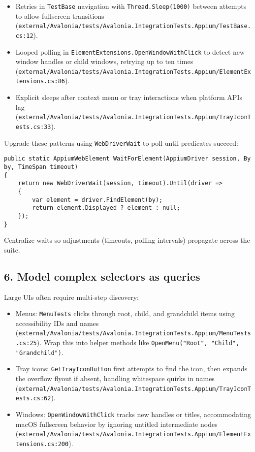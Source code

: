 \begin{itemize}
\tightlist
\item
  Retries in \passthrough{\lstinline!TestBase!} navigation with
  \passthrough{\lstinline!Thread.Sleep(1000)!} between attempts to allow
  fullscreen transitions
  (\passthrough{\lstinline!external/Avalonia/tests/Avalonia.IntegrationTests.Appium/TestBase.cs:12!}).
\item
  Looped polling in
  \passthrough{\lstinline!ElementExtensions.OpenWindowWithClick!} to
  detect new window handles or child windows, retrying up to ten times
  (\passthrough{\lstinline!external/Avalonia/tests/Avalonia.IntegrationTests.Appium/ElementExtensions.cs:86!}).
\item
  Explicit sleeps after context menu or tray interactions when platform
  APIs lag
  (\passthrough{\lstinline!external/Avalonia/tests/Avalonia.IntegrationTests.Appium/TrayIconTests.cs:33!}).
\end{itemize}

Upgrade these patterns using \passthrough{\lstinline!WebDriverWait!} to
poll until predicates succeed:

\begin{lstlisting}
public static AppiumWebElement WaitForElement(AppiumDriver session, By by, TimeSpan timeout)
{
    return new WebDriverWait(session, timeout).Until(driver =>
    {
        var element = driver.FindElement(by);
        return element.Displayed ? element : null;
    });
}
\end{lstlisting}

Centralize waits so adjustments (timeouts, polling intervals) propagate
across the suite.

\subsection{6. Model complex selectors as
queries}\label{model-complex-selectors-as-queries}

Large UIs often require multi-step discovery:

\begin{itemize}
\tightlist
\item
  Menus: \passthrough{\lstinline!MenuTests!} clicks through root, child,
  and grandchild items using accessibility IDs and names
  (\passthrough{\lstinline!external/Avalonia/tests/Avalonia.IntegrationTests.Appium/MenuTests.cs:25!}).
  Wrap this into helper methods like
  \passthrough{\lstinline!OpenMenu("Root", "Child", "Grandchild")!}.
\item
  Tray icons: \passthrough{\lstinline!GetTrayIconButton!} first attempts
  to find the icon, then expands the overflow flyout if absent, handling
  whitespace quirks in names
  (\passthrough{\lstinline!external/Avalonia/tests/Avalonia.IntegrationTests.Appium/TrayIconTests.cs:62!}).
\item
  Windows: \passthrough{\lstinline!OpenWindowWithClick!} tracks new
  handles or titles, accommodating macOS fullscreen behavior by ignoring
  untitled intermediate nodes
  (\passthrough{\lstinline!external/Avalonia/tests/Avalonia.IntegrationTests.Appium/ElementExtensions.cs:200!}).
\end{itemize}

